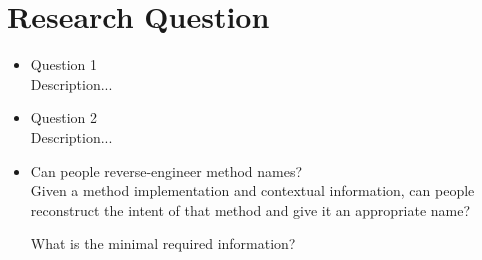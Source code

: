 \section{Research Question}

\begin{itemize}
	\item Question 1\\
	{\small Description...}
	
	\item  Question 2\\
	{\small Description...}
	
	\item Can people reverse-engineer method names?\\
	{\small Given a method implementation and contextual information, can people reconstruct the intent of that method and give it an appropriate name?}
	
		\subitem What is the minimal required information?
\end{itemize}